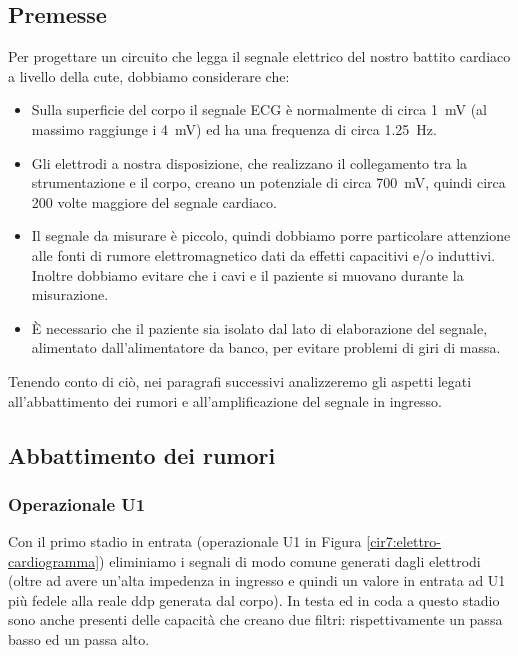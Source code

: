 \subsection{Premesse}

Per progettare un circuito che legga il segnale elettrico del nostro battito cardiaco a livello della cute, dobbiamo considerare che:
\begin{itemize} [noitemsep]
	\item Sulla superficie del corpo il segnale ECG è normalmente di circa \SI{1}{mV} (al massimo raggiunge i \SI{4}{mV}) ed ha una frequenza di circa \SI{1.25}{\Hz}.
	\item Gli elettrodi a nostra disposizione, che realizzano il collegamento tra la strumentazione e il corpo, creano un potenziale di circa \SI{700}{\mV}, quindi circa \num{200} volte maggiore del segnale cardiaco.
	\item Il segnale da misurare è piccolo, quindi dobbiamo porre particolare attenzione alle fonti di rumore elettromagnetico dati da effetti capacitivi e/o induttivi. Inoltre dobbiamo evitare che i cavi e il paziente si muovano durante la misurazione.
	\item È necessario che il paziente sia isolato dal lato di elaborazione del segnale, alimentato dall'alimentatore da banco, per evitare problemi di giri di massa.
\end{itemize}

Tenendo conto di ciò, nei paragrafi successivi analizzeremo gli aspetti legati all'abbattimento dei rumori e all'amplificazione del segnale in ingresso.

\subsection{Abbattimento dei rumori}

\subsubsection*{Operazionale U1}

Con il primo stadio in entrata (operazionale U1 in Figura \ref{cir7:elettro-cardiogramma}) eliminiamo i segnali di modo comune generati dagli elettrodi (oltre ad avere un'alta impedenza in ingresso e quindi un valore in entrata ad U1 più fedele alla reale ddp generata dal corpo). In testa ed in coda a questo stadio sono anche presenti delle capacità che creano due filtri: rispettivamente un passa basso ed un passa alto.

